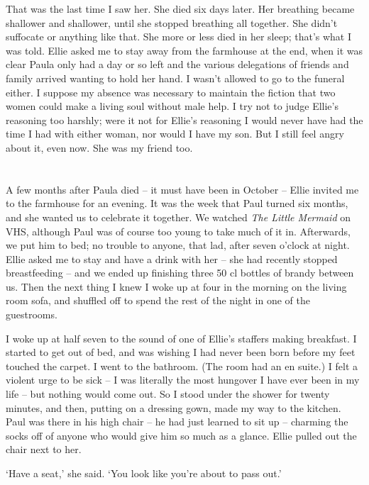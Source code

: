 That was the last time I saw her. She died six days later. Her breathing became shallower and shallower, until she stopped breathing all together. She didn't suffocate or anything like that. She more or less died in her sleep; that's what I was told. Ellie asked me to stay away from the farmhouse at the end, when it was clear Paula only had a day or so left and the various delegations of friends and family arrived wanting to hold her hand. I wasn't allowed to go to the funeral either. I suppose my absence was necessary to maintain the fiction that two women could make a living soul without male help. I try not to judge Ellie's reasoning too harshly; were it not for Ellie's reasoning I would never have had the time I had with either woman, nor would I have my son. But I still feel angry about it, even now. She was my friend too.

\section{}

A few months after Paula died -- it must have been in October -- Ellie invited me to the farmhouse for an evening. It was the week that Paul turned six months, and she wanted us to celebrate it together. We watched \textit{The Little Mermaid} on VHS, although Paul was of course too young to take much of it in. Afterwards, we put him to bed; no trouble to anyone, that lad, after seven o'clock at night. Ellie asked me to stay and have a drink with her -- she had recently stopped breastfeeding -- and we ended up finishing three 50 cl bottles of brandy between us. Then the next thing I knew I woke up at four in the morning on the living room sofa, and shuffled off to spend the rest of the night in one of the guestrooms.

I woke up at half seven to the sound of one of Ellie's staffers making breakfast. I started to get out of bed, and was wishing I had never been born before my feet touched the carpet. I went to the bathroom. (The room had an en suite.) I felt a violent urge to be sick -- I was literally the most hungover I have ever been in my life -- but nothing would come out. So I stood under the shower for twenty minutes, and then, putting on a dressing gown, made my way to the kitchen. Paul was there in his high chair -- he had just learned to sit up -- charming the socks off of anyone who would give him so much as a glance. Ellie pulled out the chair next to her.

`Have a seat,' she said. `You look like you're about to pass out.'

